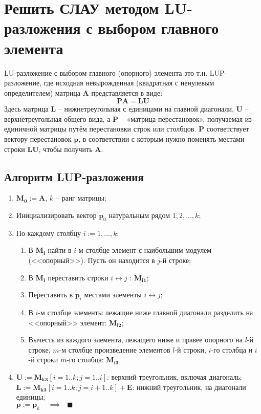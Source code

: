 \clearpage
\section{Решить СЛАУ методом LU-разложения с выбором главного элемента}
LU-разложение с выбором главного (опорного) элемента это т.н. LUP-разложение, где исходная невырожденная (квадратная с ненулевым определителем) матрица $\mathbf{A}$ представляется в виде:
\begin{equation}
    \mathbf{PA} = \mathbf{LU}
\end{equation}
Здесь матрица $\mathbf{L}$ -- нижнетреугольная с единицами на главной диагонали, $\mathbf{U}$ -- верхнетреугольная общего вида, а $\mathbf{P}$ -- «матрица перестановок», получаемая из единичной матрицы путём перестановки строк или столбцов. $\mathbf{P}$ соответствует вектору перестановок $\mathbf{p}$, в соответствии с которым нужно поменять местами строки $\mathbf{LU}$, чтобы получить $\mathbf{A}$.

\subsection{Алгоритм LUP-разложения}
\begin{enumerate}
    \item $\mathbf{M_0:=A}$, $k$ -- ранг матрицы;
    \item Инициализировать вектор $\mathbf{p}_0$ натуральным рядом $1,2,..., k$;
    \item По каждому столбцу $i := 1,...,k$:
    \begin{enumerate}
        \item В $\mathbf{M_i}$ найти в $i$-м столбце элемент с наибольшим модулем (<<опорный>>). Пусть он находится в $j$-й строке;

        \item В $\mathbf{M_i}$ переставить строки $i \leftrightarrow j$ : $\mathbf{M_{i1}}$;

        \item Переставить в $\mathbf{p}_i$ местами элементы $i \leftrightarrow j$;

        \item В $i$-м столбце элементы лежащие ниже главной диагонали разделить на <<опорный>> элемент: $\mathbf{M_{i2}}$;

        \item Вычесть из каждого элемента, лежащего ниже и правее опорного на $l$-й строке, $m$-м столбце произведение элементов $l$-й строки, $i$-го столбца и $i$-й строки $m$-го столбца: $\mathbf{M_{i3}}$
    \end{enumerate}

    \item $\mathbf{U} := \mathbf{M_{k3}}[i=1..k; j=1..i]$: верхний треугольник, включая диагональ;\\
    $\mathbf{L} := \mathbf{M_{k3}}[i=1..k; j=i+1..k] + \mathbf{E}$: нижний треугольник, на диагонали единицы;\\
    $\mathbf{p} := \mathbf{p}_k ~~~~~\implies ~~~ \blacksquare$
\end{enumerate}

